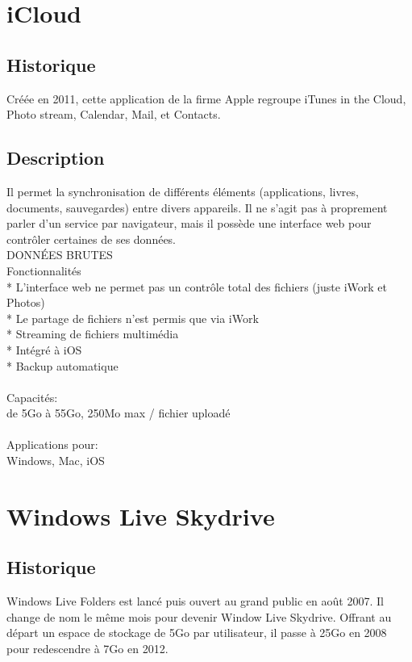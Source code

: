 \section{iCloud}

\subsection{Historique}
Créée en 2011, cette application de la firme Apple regroupe iTunes in the Cloud, Photo stream, Calendar, Mail, et Contacts.

\subsection{Description}
Il permet la synchronisation de différents éléments (applications, livres, documents, sauvegardes) entre divers appareils. Il ne s'agit pas à proprement parler d'un service par navigateur, mais il possède une interface web pour contrôler certaines de ses données.\\
DONNÉES BRUTES\\
Fonctionnalités\\
* L'interface web ne permet pas un contrôle total des fichiers (juste iWork et Photos)\\
* Le partage de fichiers n'est permis que via iWork\\
* Streaming de fichiers multimédia\\
* Intégré à iOS\\
* Backup automatique\\
\\
Capacités:\\
de 5Go à 55Go, 250Mo max / fichier uploadé\\
\\
Applications pour:\\
Windows, Mac, iOS\\


\section{Windows Live Skydrive}

\subsection{Historique}
Windows Live Folders est lancé puis ouvert au grand public en août 2007. Il change de nom le même mois pour devenir Window Live Skydrive. Offrant au départ un espace de stockage de 5Go par utilisateur, il passe à 25Go en 2008 pour redescendre à 7Go en 2012.\\

